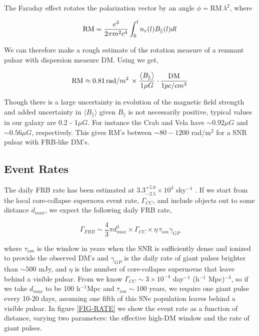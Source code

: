 \documentclass[useAMS,usenatbib]{mn2e}
\begin{document}
The Faraday effect rotates the polarization vector
by an angle $\phi = $RM$\, \lambda^2$, where

\begin{equation}
\textup{RM} = \frac{e^3}{2\pi m^2 c^4} \int_0^{l} n_e(l) B_\parallel (l) dl
\end{equation}

We can therefore make a rough estimate of the rotation measure of a remnant 
pulsar with dispersion measure DM. Using 
\cite{2014ira..book.....B} we get,

\begin{equation}
\textup{RM} \approx 0.81\,\textup{rad} / m^2 \, \times \frac{\left < B_{\parallel} \right >}
{1 \mu G} \cdot \frac{\textup{DM}}{1 pc/cm^3} 
\end{equation}

Though there is a large uncertainty in evolution of the magnetic field strength and added
uncertainty in $\langle B_{\parallel} \rangle$ given $B_{\parallel}$ is not necessarily positive, 
typical values in our galaxy are 0.2 - 1$\mu G$. For instance the Crab and Vela have 
$ \sim 0.92 \mu G$ and $\sim 0.56 \mu G$, respectively. 
This gives RM's between $\sim 80-1200$
rad/m$^2$ for a SNR pulsar with FRB-like DM's.

\subsection{Event Rates}

The daily FRB rate has been estimated at $3.3^{+5.0}_{-2.5}\times10^3$ sky$^{-1}$ 
\citep{2015arXiv150500834R}. If we start from the local core-collapse supernova
event rate, $\Gamma_{CC}$, and include objects out to some distance $d_{max}$,
we expect the following daily FRB rate, 

\begin{equation}
\Gamma_{FRB} \sim  \frac{4}{3} \pi d_{max}^3 \times \Gamma_{CC} \times
 \eta \, \tau_{ion} \gamma_{GP}
\end{equation}

\noindent where $\tau_{ion}$ is the window in years when the SNR is sufficiently
dense and ionized to provide the observed DM's and $\gamma_{GP}$
is the daily rate of giant pulses brighter than $\sim 500$ mJy, and $\eta$
is the number of core-collapse supernovae that leave behind a visible pulsar. 
From \cite{2014ApJ...792..135T} we know  
$\Gamma_{CC}\sim3 \times 10^{-4}$ day$^{-1}$ (h$^{-1}$ Mpc)$^{-3}$,
so if we take $d_{max}$ to be 100 h$^{-1}$Mpc and $\tau_{ion}\sim100$ years,
we require one giant pulse every 10-20 days, assuming one fifth of this SNe population
leaves behind a visible pulsar.
In figure \ref{FIG-RATE} 
we show the event rate as a function of distance, varying two parameters: the 
effective high-DM window and the rate of giant pulses. 
\end{document}
